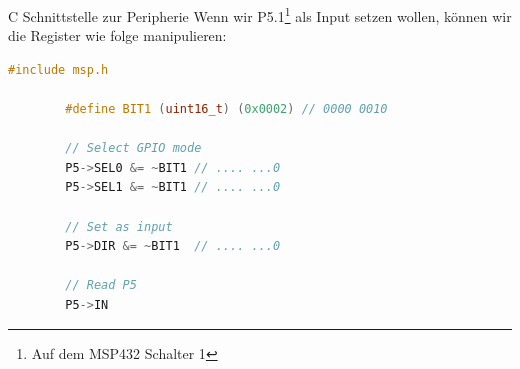 \begin{example}{C Schnittstelle zur Peripherie}
    Wenn wir P5.1\footnote{Auf dem MSP432 Schalter 1} als Input setzen wollen, können wir die Register wie folge manipulieren:

    \begin{lstlisting}[language=c]
        #include msp.h

        #define BIT1 (uint16_t) (0x0002) // 0000 0010

        // Select GPIO mode
        P5->SEL0 &= ~BIT1 // .... ...0
        P5->SEL1 &= ~BIT1 // .... ...0

        // Set as input
        P5->DIR &= ~BIT1  // .... ...0

        // Read P5
        P5->IN
    \end{lstlisting}
\end{example}